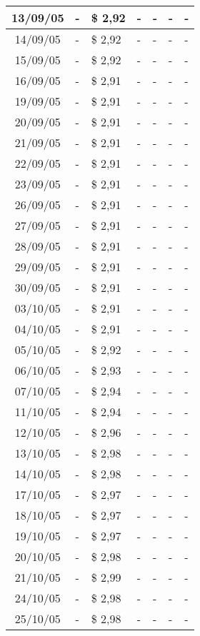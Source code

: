 \begin{center}
\begin{longtable}{|c|p{1.5cm}|p{1.5cm}|p{1.5cm}|p{1.5cm}|p{1.5cm}|p{1.5cm}|}
13/09/05 & - & \$ 2,92 & - & - & - & - \\ \hline
14/09/05 & - & \$ 2,92 & - & - & - & - \\ \hline
15/09/05 & - & \$ 2,92 & - & - & - & - \\ \hline
16/09/05 & - & \$ 2,91 & - & - & - & - \\ \hline
19/09/05 & - & \$ 2,91 & - & - & - & - \\ \hline
20/09/05 & - & \$ 2,91 & - & - & - & - \\ \hline
21/09/05 & - & \$ 2,91 & - & - & - & - \\ \hline
22/09/05 & - & \$ 2,91 & - & - & - & - \\ \hline
23/09/05 & - & \$ 2,91 & - & - & - & - \\ \hline
26/09/05 & - & \$ 2,91 & - & - & - & - \\ \hline
27/09/05 & - & \$ 2,91 & - & - & - & - \\ \hline
28/09/05 & - & \$ 2,91 & - & - & - & - \\ \hline
29/09/05 & - & \$ 2,91 & - & - & - & - \\ \hline
30/09/05 & - & \$ 2,91 & - & - & - & - \\ \hline
03/10/05 & - & \$ 2,91 & - & - & - & - \\ \hline
04/10/05 & - & \$ 2,91 & - & - & - & - \\ \hline
05/10/05 & - & \$ 2,92 & - & - & - & - \\ \hline
06/10/05 & - & \$ 2,93 & - & - & - & - \\ \hline
07/10/05 & - & \$ 2,94 & - & - & - & - \\ \hline
11/10/05 & - & \$ 2,94 & - & - & - & - \\ \hline
12/10/05 & - & \$ 2,96 & - & - & - & - \\ \hline
13/10/05 & - & \$ 2,98 & - & - & - & - \\ \hline
14/10/05 & - & \$ 2,98 & - & - & - & - \\ \hline
17/10/05 & - & \$ 2,97 & - & - & - & - \\ \hline
18/10/05 & - & \$ 2,97 & - & - & - & - \\ \hline
19/10/05 & - & \$ 2,97 & - & - & - & - \\ \hline
20/10/05 & - & \$ 2,98 & - & - & - & - \\ \hline
21/10/05 & - & \$ 2,99 & - & - & - & - \\ \hline
24/10/05 & - & \$ 2,98 & - & - & - & - \\ \hline
25/10/05 & - & \$ 2,98 & - & - & - & - \\ \hline

\end{longtable}
\end{center}
